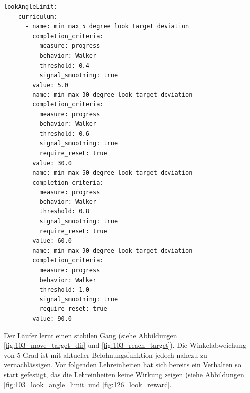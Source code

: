 \begin{lstlisting}[caption={ Lehrplan für das Blickziel},captionpos=b,label={lst:lehrplan_blickziel}]
lookAngleLimit:
    curriculum:
      - name: min max 5 degree look target deviation
        completion_criteria:
          measure: progress
          behavior: Walker
          threshold: 0.4
          signal_smoothing: true
        value: 5.0
      - name: min max 30 degree look target deviation
        completion_criteria:
          measure: progress
          behavior: Walker
          threshold: 0.6
          signal_smoothing: true
          require_reset: true
        value: 30.0
      - name: min max 60 degree look target deviation
        completion_criteria:
          measure: progress
          behavior: Walker
          threshold: 0.8
          signal_smoothing: true
          require_reset: true
        value: 60.0
      - name: min max 90 degree look target deviation
        completion_criteria:
          measure: progress
          behavior: Walker
          threshold: 1.0
          signal_smoothing: true
          require_reset: true
        value: 90.0
\end{lstlisting}

Der Läufer lernt einen stabilen Gang (siehe Abbildungen \ref{fig:103_move_target_dir} und \ref{fig:103_reach_target}). Die Winkelabweichung von 5 Grad ist mit aktueller Belohnungsfunktion jedoch nahezu zu vernachlässigen. Vor folgenden Lehreinheiten hat sich bereits ein Verhalten so start gefestigt, das die Lehreinheiten keine Wirkung zeigen (siehe Abbildungen \ref{fig:103_look_angle_limit} und \ref{fig:126_look_reward}.

